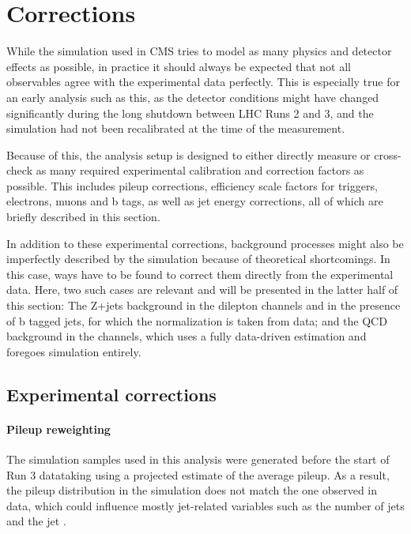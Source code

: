\section{Corrections}
\label{sec:ttxs:corrections}

While the simulation used in CMS tries to model as many physics and detector effects as possible, in practice it should always be expected that not all observables agree with the experimental data perfectly. This is especially true for an early analysis such as this, as the detector conditions might have changed significantly during the long shutdown between LHC Runs 2 and 3, and the simulation had not been recalibrated at the time of the measurement. 

Because of this, the analysis setup is designed to either directly measure or cross-check as many required experimental calibration and correction factors as possible. This includes pileup corrections, efficiency scale factors for triggers, electrons, muons and b tags, as well as jet energy corrections, all of which are briefly described in this section.

In addition to these experimental corrections, background processes might also be imperfectly described by the simulation because of theoretical shortcomings. In this case, ways have to be found to correct them directly from the experimental data. Here, two such cases are relevant and will be presented in the latter half of this section: The Z+jets background in the dilepton channels and in the presence of b tagged jets, for which the normalization is taken from data; and the QCD background in the \ljets channels, which uses a fully data-driven estimation and foregoes simulation entirely.

\subsection{Experimental corrections}
\label{sec:ttxs:scalefactors}

\paragraph{Pileup reweighting}

The simulation samples used in this analysis were generated before the start of Run 3 datataking using a projected estimate of the average pileup. As a result, the pileup distribution in the simulation does not match the one observed in data, which could influence mostly jet-related variables such as the number of jets and the jet \pt.

